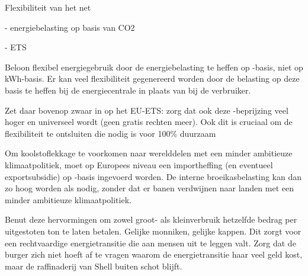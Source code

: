 \begin{voorstel}{Flexibiliteit van het net}
\begin{multicols*}{2}
\begin{aanbevelingen}
- energiebelasting op basis van CO2

- ETS

Beloon flexibel energiegebruik door de energiebelasting te heffen op \COO-basis, niet op kWh-basis. Er kan veel flexibiliteit gegenereerd worden door de belasting op deze basis te heffen bij de energiecentrale in plaats van bij de verbruiker.

Zet daar bovenop zwaar in op het EU-ETS: zorg dat ook deze \COO-beprijzing veel hoger en universeel wordt (geen gratis rechten meer). Ook dit is cruciaal om de flexibiliteit te ontsluiten die nodig is voor 100\% duurzaam

Om koolstoflekkage te voorkomen naar werelddelen met een minder ambitieuze klimaatpolitiek, moet op Europees niveau een importheffing (en eventueel exportsubsidie) op \COO-basis ingevoerd worden. De interne broeikasbelasting kan dan zo hoog worden als nodig, zonder dat er banen verdwijnen naar landen met een minder ambitieuze klimaatpolitiek. 

Benut deze hervormingen om zowel groot- als kleinverbruik hetzelfde bedrag per uitgestoten ton \COO te laten betalen. Gelijke monniken, gelijke kappen. Dit zorgt voor een rechtvaardige energietransitie die aan mensen uit te leggen valt. Zorg dat de burger zich niet hoeft af te vragen waarom de energietransitie haar veel geld kost, maar de raffinaderij van Shell buiten schot blijft.


\end{aanbevelingen}

\end{multicols*}

\end{voorstel}

